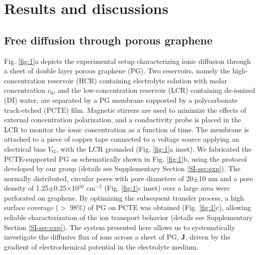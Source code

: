 \documentclass[journal=langd5,email=true, hyperref=true, keywords=false]{achemso}
\newcommand{\Fig}{Fig.}
\begin{document}
\section{Results and discussions}
\label{sec:res}

\subsection{Free diffusion through porous graphene}
\label{sec:res-1}

\Fig{} \ref{fig:1}a depicts the experimental setup characterizing
ionic diffusion through a sheet of double layer porous graphene
(PG). Two reservoirs, namely the high-concentration reservoir (HCR)
containing electrolyte solution with molar concentration $c_0$, and
the low-concentration reservoir (LCR) containing de-ionized (DI)
water, are separated by a PG membrane supported by a polycarbonate
track-etched (PCTE) film. Magnetic stirrers are used to minimize the
effects of external concentration polarization, and a conductivity
probe is placed in the LCR to monitor the ionic concentration as a
function of time. The membrane is attached to a piece of copper tape
connected to a voltage source applying an electrical bias
$V_{\mathrm{G}}$, with the LCR grounded (\Fig{} \ref{fig:1}a
inset). We fabricated the PCTE-supported PG as schematically shown in
\Fig{} \ref{fig:1}b, using the protocol developed by our group
\cite{Choi_2018} (details see Supplementary Section
\ref{SI-sec:exp}). The normally distributed, circular pores with pore
diameters of 20$\pm$10 nm and a pore density of
1.25$\pm$0.25$\times$10$^{10}$ cm$^{-2}$ (\Fig{} \ref{fig:1}c inset)
over a large area were perforated on graphene.  By optimizing the
subsequent transfer process, a high surface coverage ($>$ 98\%) of PG
on PCTE was obtained (\Fig{} \ref{fig:1}c), allowing reliable
characterization of the ion transport behavior (details see
Supplementary Section \ref{SI-sec:exp}).  The system presented here
allows us to systematically investigate the diffusive flux of ions
across a sheet of PG, $\boldsymbol{J}$, driven by the gradient of
electrochemical potential in the electrolyte medium.
\end{document}
